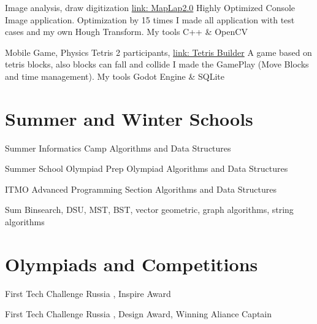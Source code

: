 \documentclass[12pt,a4paper]{moderncv}
\begin{document}
         {Image analysis, draw digitization} {\textcolor{blue} {\href{https://github.com/a-alex-l/MapLap_2} {link: MapLap2.0}}} {\newline Highly Optimized Console Image application. Optimization by 15 times}{} {I made all application with test cases and my own Hough Transform. My tools \textcolor{Attention} {C++ \& OpenCV} }
        
         {Mobile Game, Physics Tetris} {2 participants, \textcolor{blue} {\href{https://github.com/a-alex-l/TetrisBuilder} {link: Tetris Builder}}} {\newline A game based on tetris blocks, also blocks can fall and collide}{} {I made the GamePlay (Move Blocks and time management). My tools \textcolor{Attention} {Godot Engine \& SQLite} }
        
    \section{Summer and Winter Schools}
        
         {Summer Informatics Camp} {}{} {Algorithms and Data Structures} {}
        
         {Summer School Olympiad Prep} {}{} {Olympiad Algorithms and Data Structures} {}
        
         {ITMO Advanced Programming Section} {}{} {Algorithms and Data Structures} {}
        
        \cventry{} {Sum} {}{} {Binsearch, DSU, MST, BST, vector geometric, graph algorithms, string algorithms} {}
    
    \section{Olympiads and Competitions}
    
         {First Tech Challenge Russia} {}{} {\textcolor{blue} {}, \textcolor{Attention} {Inspire Award}} {}
        
         {First Tech Challenge Russia} {}{} {\textcolor{blue} {}, \textcolor{Attention} {Design Award}, \textcolor{Attention} {Winning Aliance Captain}} {}
        
\end{document}
